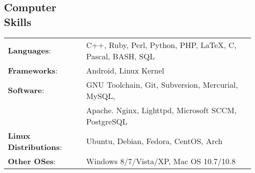 \documentclass[margin]{res}
\begin{document}
\begin{resume}
    \section{Computer \\ Skills}
      \begin{tabular}{l p{3.6in}}
        \textbf{Languages}:                   & C++, Ruby, Perl, Python, PHP, \LaTeX, C, Pascal, BASH, SQL \\ [1pt]
        \textbf{Frameworks}:                  & Android, Linux Kernel \\ [1pt]
        \textbf{Software}:                    & GNU Toolchain, Git, Subversion, Mercurial, MySQL, \\
                                              & Apache. Nginx, Lighttpd, Microsoft SCCM, PostgreSQL \\ [1pt]
        \textbf{Linux Distributions}:         & Ubuntu, Debian, Fedora, CentOS, Arch \\ [1pt]
        \textbf{Other OSes}:                  & Windows 8/7/Vista/XP, Mac OS 10.7/10.8 \\ [1pt]
      \end{tabular}

  \end{resume} 
\end{document}
